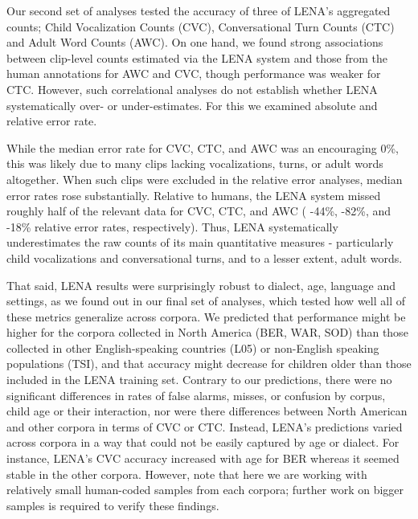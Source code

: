 \documentclass[english,floatsintext,man]{apa6}
\begin{document}
Our second set of analyses tested the accuracy of three of LENA's
aggregated counts; Child Vocalization Counts (CVC), Conversational Turn
Counts (CTC) and Adult Word Counts (AWC). On one hand, we found strong
associations between clip-level counts estimated via the LENA system and
those from the human annotations for AWC and CVC, though performance was
weaker for CTC. However, such correlational analyses do not establish
whether LENA systematically over- or under-estimates. For this we
examined absolute and relative error rate.

While the median error rate for CVC, CTC, and AWC was an encouraging
0\%, this was likely due to many clips lacking vocalizations, turns, or
adult words altogether. When such clips were excluded in the relative
error analyses, median error rates rose substantially. Relative to
humans, the LENA system missed roughly half of the relevant data for
CVC, CTC, and AWC ( -44\%, -82\%, and -18\% relative error rates,
respectively). Thus, LENA systematically underestimates the raw counts
of its main quantitative measures - particularly child vocalizations and
conversational turns, and to a lesser extent, adult words.

That said, LENA results were surprisingly robust to dialect, age,
language and settings, as we found out in our final set of analyses,
which tested how well all of these metrics generalize across corpora. We
predicted that performance might be higher for the corpora collected in
North America (BER, WAR, SOD) than those collected in other
English-speaking countries (L05) or non-English speaking populations
(TSI), and that accuracy might decrease for children older than those
included in the LENA training set. Contrary to our predictions, there
were no significant differences in rates of false alarms, misses, or
confusion by corpus, child age or their interaction, nor were there
differences between North American and other corpora in terms of CVC or
CTC. Instead, LENA's predictions varied across corpora in a way that
could not be easily captured by age or dialect. For instance, LENA's CVC
accuracy increased with age for BER whereas it seemed stable in the
other corpora. However, note that here we are working with relatively
small human-coded samples from each corpora; further work on bigger
samples is required to verify these findings.
\end{document}
